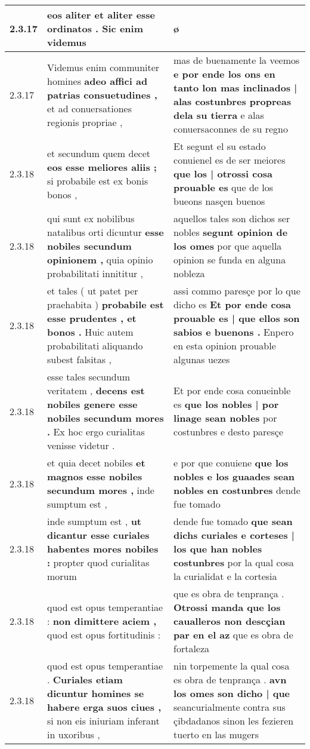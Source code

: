 \begin{tabular}{|p{1cm}|p{6.5cm}|p{6.5cm}|}
2.3.17 & eos aliter \textbf{ et aliter esse ordinatos . } Sic enim videmus & ø \\\hline
2.3.17 & Videmus enim communiter homines \textbf{ adeo affici ad patrias consuetudines , } et ad conuersationes regionis propriae , & mas de buenamente la veemos \textbf{ e por ende los ons en tanto lon mas inclinados | alas costunbres propreas dela su tierra } e alas conuersaconnes de su regno \\\hline
2.3.18 & et secundum quem decet \textbf{ eos esse meliores aliis ; } si probabile est ex bonis bonos , & Et segunt el su estado conuienel es de ser meiores \textbf{ que los | otrossi cosa prouable es } que de los bueons nasçen buenos \\\hline
2.3.18 & qui sunt ex nobilibus natalibus orti dicuntur \textbf{ esse nobiles secundum opinionem , } quia opinio probabilitati innititur , & aquellos tales son dichos ser nobles \textbf{ segunt opinion de los omes } por que aquella opinion se funda en alguna nobleza \\\hline
2.3.18 & et tales ( ut patet per praehabita ) \textbf{ probabile est esse prudentes , et bonos . } Huic autem probabilitati aliquando subest falsitas , & assi commo paresçe por lo que dicho es \textbf{ Et por ende cosa prouable es | que ellos son sabios e buenons . } Enpero en esta opinion prouable algunas uezes \\\hline
2.3.18 & esse tales secundum veritatem , \textbf{ decens est nobiles genere esse nobiles secundum mores . } Ex hoc ergo curialitas venisse videtur . & Et por ende cosa conueinble es \textbf{ que los nobles | por linage sean nobles } por costunbres e desto paresçe \\\hline
2.3.18 & et quia decet nobiles \textbf{ et magnos esse nobiles secundum mores , } inde sumptum est , & e por que conuiene \textbf{ que los nobles e los guaades sean nobles en costunbres } dende fue tomado \\\hline
2.3.18 & inde sumptum est , \textbf{ ut dicantur esse curiales habentes mores nobiles : } propter quod curialitas morum & dende fue tomado \textbf{ que sean dichs curiales e corteses | los que han nobles costunbres } por la qual cosa la curialidat e la cortesia \\\hline
2.3.18 & quod est opus temperantiae : \textbf{ non dimittere aciem , } quod est opus fortitudinis : & que es obra de tenprança . \textbf{ Otrossi manda que los caualleros non descçian par en el az } que es obra de fortaleza \\\hline
2.3.18 & quod est opus temperantiae . \textbf{ Curiales etiam dicuntur homines se habere erga suos ciues , } si non eis iniuriam inferant in uxoribus , & nin torpemente la qual cosa es obra de tenprança . \textbf{ avn los omes son dicho | que } seancurialmente contra sus çibdadanos sinon les fezieren tuerto en las mugers \\\hline

\end{tabular}
